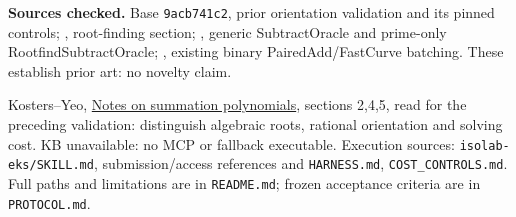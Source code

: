\documentclass[10pt]{article}
\begin{document}
\textbf{Sources checked.} Base \texttt{9acb741c2}, prior orientation validation and its pinned controls;
, root-finding section;
, generic SubtractOracle and prime-only RootfindSubtractOracle;
, existing binary PairedAdd/FastCurve batching. These establish prior art: no novelty claim.

Kosters--Yeo, \href{https://arxiv.org/html/1503.08001v2}{Notes on summation polynomials}, sections 2,4,5, read for the preceding validation: distinguish algebraic roots, rational orientation and solving cost. KB unavailable: no MCP or fallback executable. Execution sources: \texttt{isolab-eks/SKILL.md}, submission/access references and \texttt{HARNESS.md}, \texttt{COST\_CONTROLS.md}. Full paths and limitations are in \texttt{README.md}; frozen acceptance criteria are in \texttt{PROTOCOL.md}.
\end{document}
